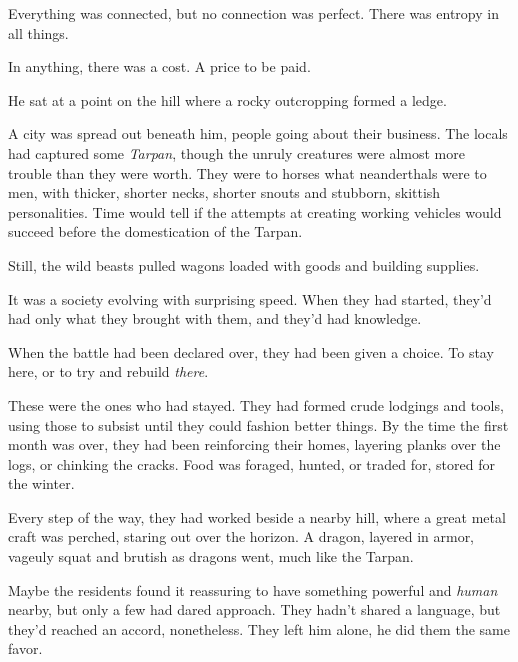 Everything was connected, but no connection was perfect.  There was entropy in all things.



In anything, there was a cost.  A price to be paid.



He sat at a point on the hill where a rocky outcropping formed a ledge.



A city was spread out beneath him, people going about their business.  The locals had captured some \emph{Tarpan}, though the unruly creatures were almost more trouble than they were worth.  They were to horses what neanderthals were to men, with thicker, shorter necks, shorter snouts and stubborn, skittish personalities.  Time would tell if the attempts at creating working vehicles would succeed before the domestication of the Tarpan.



Still, the wild beasts pulled wagons loaded with goods and building supplies.



It was a society evolving with surprising speed.  When they had started, they'd had only what they brought with them, and they'd had knowledge.



When the battle had been declared over, they had been given a choice.  To stay here, or to try and rebuild \emph{there}.



These were the ones who had stayed.  They had formed crude lodgings and tools, using those to subsist until they could fashion better things.  By the time the first month was over, they had been reinforcing their homes, layering planks over the logs, or chinking the cracks.  Food was foraged, hunted, or traded for, stored for the winter.



Every step of the way, they had worked beside a nearby hill, where a great metal craft was perched, staring out over the horizon.  A dragon, layered in armor, vageuly squat and brutish as dragons went, much like the Tarpan.



Maybe the residents found it reassuring to have something powerful and \emph{human }nearby, but only a few had dared approach.  They hadn't shared a language, but they'd reached an accord, nonetheless.  They left him alone, he did them the same favor.



